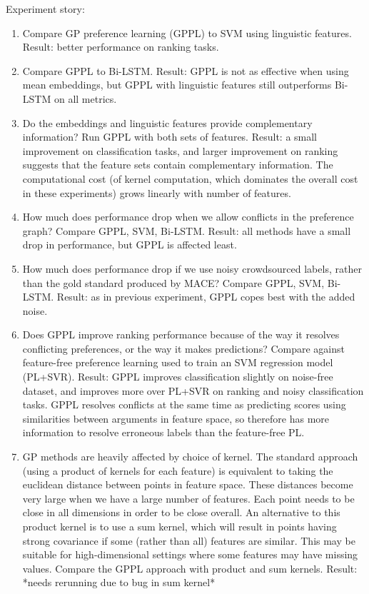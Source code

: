 Experiment story:
\begin{enumerate}
  \item Compare GP preference learning (GPPL) to SVM using linguistic features. Result: better performance on ranking tasks.
  \item Compare GPPL to Bi-LSTM. Result: GPPL is not as effective when using mean embeddings, but GPPL with linguistic features still outperforms Bi-LSTM on all metrics.
  \item Do the embeddings and linguistic features provide complementary information? Run GPPL with both sets of features. Result: a small improvement on classification tasks, and larger improvement on ranking suggests that the feature sets contain complementary information. The computational cost (of kernel computation, which dominates the overall cost in these experiments) grows linearly with number of features. 
  \item How much does performance drop when we allow conflicts in the preference graph? Compare GPPL, SVM, Bi-LSTM. Result: all methods have a small drop in performance, but GPPL is affected least.
  \item How much does performance drop if we use noisy crowdsourced labels, rather than the gold standard produced by MACE? Compare GPPL, SVM, Bi-LSTM. Result: as in previous experiment, GPPL copes best with the added noise. 
  \item Does GPPL improve ranking performance because of the way it resolves conflicting preferences, or the way it makes predictions? Compare against feature-free preference learning used to train an SVM regression model (PL+SVR). Result: GPPL improves classification slightly on noise-free dataset, and improves more over PL+SVR on ranking and noisy classification tasks. GPPL resolves conflicts at the same time as predicting scores using similarities between arguments in feature space, so therefore has more information to resolve erroneous labels than the feature-free PL.
  \item GP methods are heavily affected by choice of kernel. The standard approach (using a product of kernels for each feature) is equivalent to taking the euclidean distance between points in feature space. These distances become very large when we have a large number of features. Each point needs to be close in all dimensions in order to be close overall. An alternative to this product kernel is to use a sum kernel, which will result in points having strong covariance if some (rather than all) features are similar. This may be suitable for high-dimensional settings where some features may have missing values. Compare the GPPL approach with product and sum kernels. Result: *needs rerunning due to bug in sum kernel*

\end{enumerate}
